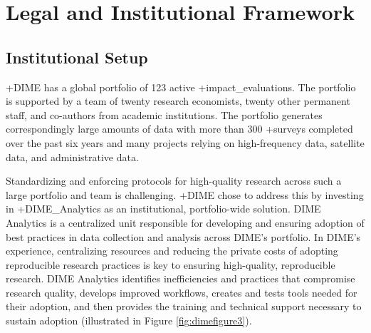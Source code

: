 \documentclass[
]{book}
\begin{document}
\hypertarget{legal-and-institutional-framework-7}{%
\section{Legal and Institutional Framework}\label{legal-and-institutional-framework-7}}

\hypertarget{institutional-setup-7}{%
\subsection{Institutional Setup}\label{institutional-setup-7}}

+DIME\textbar{} has a global portfolio of 123 active +impact\_evaluations\textbar. The portfolio is supported by a team of twenty research economists, twenty other permanent staff, and co-authors from academic institutions. The portfolio generates correspondingly large amounts of data with more than 300 +surveys\textbar{} completed over the past six years and many projects relying on high-frequency data, satellite data, and administrative data.

Standardizing and enforcing protocols for high-quality research across such a large portfolio and team is challenging. +DIME\textbar{} chose to address this by investing in +DIME\_Analytics\textbar{} as an institutional, portfolio-wide solution. DIME Analytics is a centralized unit responsible for developing and ensuring adoption of best practices in data collection and analysis across DIME's portfolio. In DIME's experience, centralizing resources and reducing the private costs of adopting reproducible research practices is key to ensuring high-quality, reproducible research. DIME Analytics identifies inefficiencies and practices that compromise research quality, develops improved workflows, creates and tests tools needed for their adoption, and then provides the training and technical support necessary to sustain adoption (illustrated in Figure \ref{fig:dimefigure3}).
\end{document}
